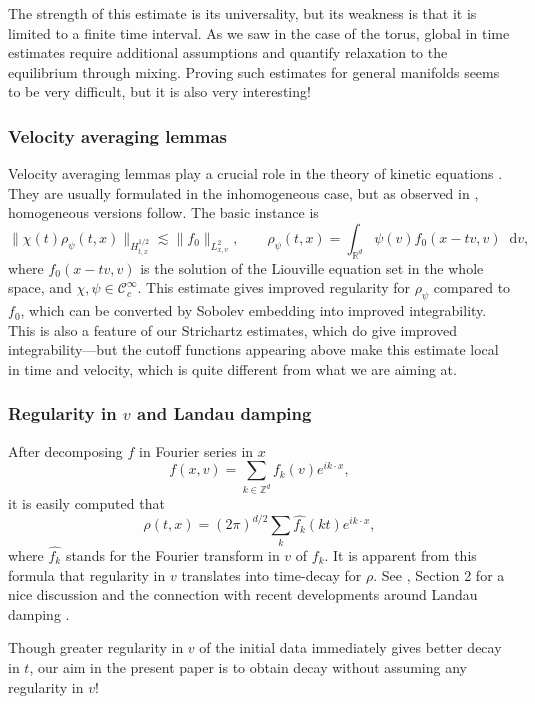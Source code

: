 \documentclass[11pt,a4paper,reqno]{amsart}
\theoremstyle{plain}
\theoremstyle{remark}
\newcommand{\dd}{\mathop{}\!\mathrm{d}}
\begin{document}
The strength of this estimate is its universality, but its weakness is that it is limited to a finite time interval. As we saw in the case of the torus, global in time estimates require additional assumptions and quantify relaxation to the equilibrium through mixing. Proving such estimates for general manifolds seems to be very difficult, but it is also very interesting!

\subsubsection{Velocity averaging lemmas} 

Velocity averaging lemmas play a crucial role in the theory of kinetic equations \cite{GLPS,GolseStRaymond,Perthame2002}. They are usually formulated in the inhomogeneous case, but as observed in \cite[Remark 3.2]{Perthame2004}, homogeneous versions follow. The basic instance is
\[
    \| \chi(t) \rho_\psi(t,x) \|_{H^{1/2}_{t,x}} \lesssim \| f_0 \|_{L^2_{x,v}}, \qquad \rho_\psi(t,x) = \int_{\mathbb{R}^d} \psi(v) f_0(x-tv,v) \dd v,
\]
where $f_0(x-tv,v)$ is the solution of the Liouville equation set in the whole space, and $\chi,\psi \in \mathcal{C}^\infty_c$. This estimate gives improved regularity for $\rho_\psi$ compared to $f_0$, which can be converted by Sobolev embedding into improved integrability. This is also a feature of our Strichartz estimates, which do give improved integrability---but the cutoff functions appearing above make this estimate local in time and velocity, which is quite different from what we are aiming at.

\subsubsection{Regularity in $v$ and Landau damping} After decomposing $f$ in Fourier series in $x$
\[
    f(x,v) = \sum_{k \in \mathbb{Z}^d} f_k(v) e^{ik\cdot x},
\]
it is easily computed that
\[
    \rho(t,x) = (2\pi)^{d/2} \sum_k \widehat{f_k}(kt) e^{ik\cdot x},
\]
where $\widehat{f_k}$ stands for the Fourier transform in $v$ of $f_k$. It is apparent from this formula that regularity in $v$ translates into time-decay for $\rho$. See \cite{Bedrossian}, Section 2 for a nice discussion and the connection with recent developments around Landau damping \cite{BedrossianMouhotVillani,MouhotVillani}.

Though greater regularity in $v$ of the initial data immediately gives better decay in $t$, our aim in the present paper is to obtain decay without assuming any regularity in $v$!
\end{document}
